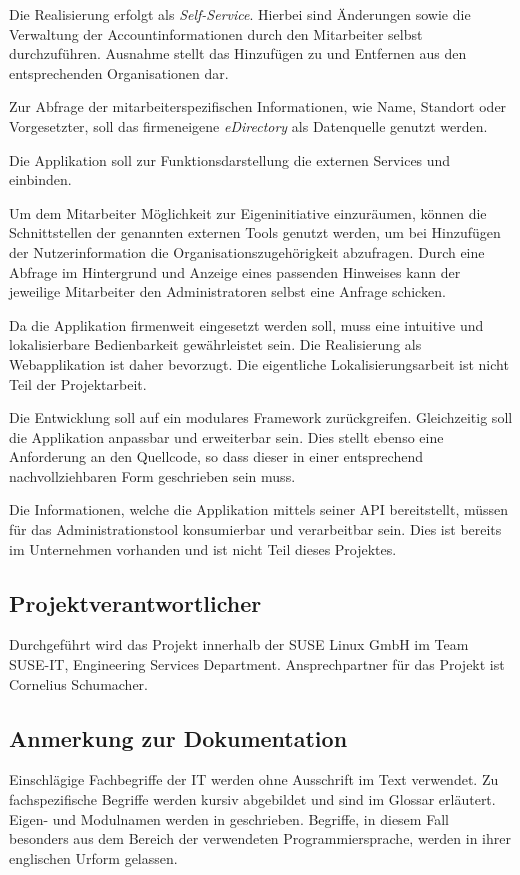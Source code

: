 Die Realisierung erfolgt als \textit{Self-Service}. Hierbei sind Änderungen sowie die Verwaltung
der Accountinformationen durch den Mitarbeiter selbst durchzuführen. Ausnahme stellt das Hinzufügen
zu und Entfernen aus den entsprechenden Organisationen dar.

Zur Abfrage der mitarbeiterspezifischen Informationen, wie Name, Standort oder Vorgesetzter, soll
das firmeneigene \textit{eDirectory} als Datenquelle genutzt werden.

Die Applikation soll zur Funktionsdarstellung die externen Services  und  einbinden.

Um dem Mitarbeiter Möglichkeit zur Eigeninitiative einzuräumen, können die Schnittstellen der
genannten externen Tools genutzt werden, um bei Hinzufügen der Nutzerinformation
die Organisationszugehörigkeit abzufragen. Durch eine Abfrage im Hintergrund und Anzeige eines
passenden Hinweises kann der jeweilige Mitarbeiter den Administratoren selbst eine Anfrage schicken.

Da die Applikation firmenweit eingesetzt werden soll, muss eine intuitive und lokalisierbare
Bedienbarkeit gewährleistet sein. Die Realisierung als Webapplikation ist daher bevorzugt.
Die eigentliche Lokalisierungsarbeit ist nicht Teil der Projektarbeit.

Die Entwicklung soll auf ein modulares Framework zurückgreifen. Gleichzeitig soll die Applikation
anpassbar und erweiterbar sein. Dies stellt ebenso eine Anforderung an den Quellcode, so dass dieser
in einer entsprechend nachvollziehbaren Form geschrieben sein muss.

Die Informationen, welche die Applikation mittels seiner API bereitstellt, müssen für das Administrationstool
 konsumierbar und verarbeitbar sein. Dies ist bereits im Unternehmen vorhanden und
ist nicht Teil dieses Projektes.

\subsection{Projektverantwortlicher}
\label{sec:Projektverantwortlicher}
Durchgeführt wird das Projekt innerhalb der SUSE Linux GmbH im Team SUSE-IT, Engineering Services
Department. Ansprechpartner für das Projekt ist Cornelius Schumacher.

\subsection{Anmerkung zur Dokumentation}
\label{sec:Anmerkung zur Dokumentation}
Einschlägige Fachbegriffe der IT werden ohne Ausschrift im Text verwendet. Zu fachspezifische
Begriffe werden kursiv abgebildet und sind im Glossar erläutert. Eigen- und Modulnamen werden in
\anf{ } geschrieben. Begriffe, in diesem Fall besonders aus dem Bereich der verwendeten Programmiersprache,
werden in ihrer englischen Urform gelassen.
\pagebreak
